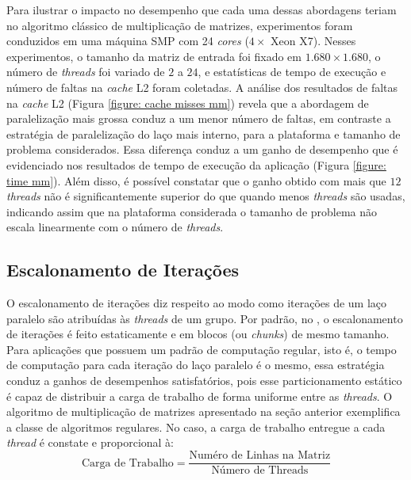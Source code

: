 \documentclass{SBCbookchapter}
\begin{document}
		Para ilustrar o impacto no desempenho que cada uma dessas abordagens
		teriam no algoritmo clássico de multiplicação de matrizes,
		experimentos foram conduzidos em uma máquina SMP com 24 \textit{cores} ($4
		\times$ Xeon X7). Nesses experimentos, o tamanho da matriz de
		entrada foi fixado em $1.680 \times 1.680$, o número de
		\textit{threads} foi variado de $2$ a $24$, e estatísticas de tempo
		de execução e número de faltas na \textit{cache} L2 foram coletadas.
		A análise dos resultados de faltas na \textit{cache} L2 (Figura
		\ref{figure: cache misses mm}) revela que a abordagem de
		paralelização mais grossa conduz a um menor número de faltas, em
		contraste a estratégia de paralelização do laço mais interno, para a
		plataforma e tamanho de problema considerados. Essa diferença conduz
		a um ganho de desempenho que é evidenciado nos resultados de tempo
		de execução da aplicação (Figura \ref{figure: time mm}). Além disso,
		é possível constatar que o ganho obtido com mais que $12$
		\textit{threads} não é significantemente superior do que quando
		menos \textit{threads} são usadas, indicando assim que na
		plataforma considerada o tamanho de problema não escala linearmente
		com o número de \textit{threads}.

	\subsection{Escalonamento de Iterações}
	\label{subsection: escalonamento de iteracoes}

		O escalonamento de iterações diz respeito ao modo como iterações de
		um laço paralelo são atribuídas às \textit{threads} de um grupo. Por padrão,
		no \openmp, o escalonamento de iterações é feito estaticamente e em
		blocos (ou \textit{chunks}) de mesmo tamanho. Para aplicações que
		possuem um padrão de computação regular, isto é, o tempo de
		computação para cada iteração do laço paralelo é o mesmo, essa
		estratégia conduz a ganhos de desempenhos satisfatórios, pois esse
		particionamento estático é capaz de distribuir a carga de trabalho
		de forma uniforme entre as \textit{threads}. O algoritmo de multiplicação de
		matrizes apresentado na seção anterior exemplifica a classe de
		algoritmos regulares. No caso, a carga de trabalho entregue a cada
		\textit{thread} é constate e proporcional à:
		\begin{equation}
			\text{Carga de Trabalho} = \dfrac{\text{Numéro de Linhas na Matriz}}%
			                                 {\text{Número de Threads}}
		\end{equation}
\end{document}
